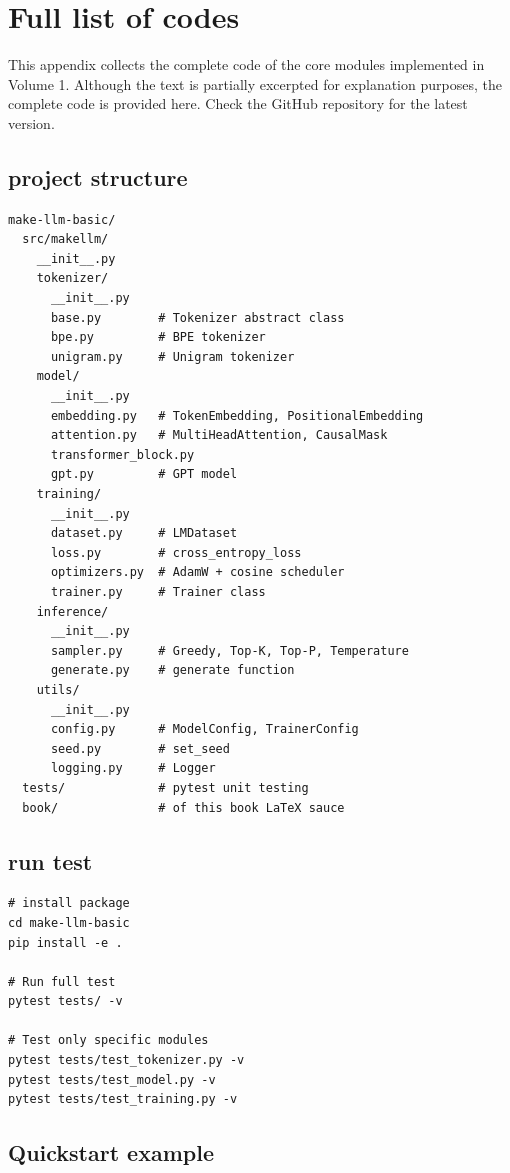 \chapter{Full list of codes}
\label{app:code}

This appendix collects the complete code of the core modules implemented in Volume 1. Although the text is partially excerpted for explanation purposes, the complete code is provided here. Check the GitHub repository for the latest version.

\section{project structure}

\begin{lstlisting}[style=bashstyle]
make-llm-basic/
  src/makellm/
    __init__.py
    tokenizer/
      __init__.py
      base.py        # Tokenizer abstract class
      bpe.py         # BPE tokenizer
      unigram.py     # Unigram tokenizer
    model/
      __init__.py
      embedding.py   # TokenEmbedding, PositionalEmbedding
      attention.py   # MultiHeadAttention, CausalMask
      transformer_block.py
      gpt.py         # GPT model
    training/
      __init__.py
      dataset.py     # LMDataset
      loss.py        # cross_entropy_loss
      optimizers.py  # AdamW + cosine scheduler
      trainer.py     # Trainer class
    inference/
      __init__.py
      sampler.py     # Greedy, Top-K, Top-P, Temperature
      generate.py    # generate function
    utils/
      __init__.py
      config.py      # ModelConfig, TrainerConfig
      seed.py        # set_seed
      logging.py     # Logger
  tests/             # pytest unit testing
  book/              # of this book LaTeX sauce
\end{lstlisting}

\section{run test}

\begin{lstlisting}[style=bashstyle]
# install package
cd make-llm-basic
pip install -e .

# Run full test
pytest tests/ -v

# Test only specific modules
pytest tests/test_tokenizer.py -v
pytest tests/test_model.py -v
pytest tests/test_training.py -v
\end{lstlisting}

\section{Quickstart example}

